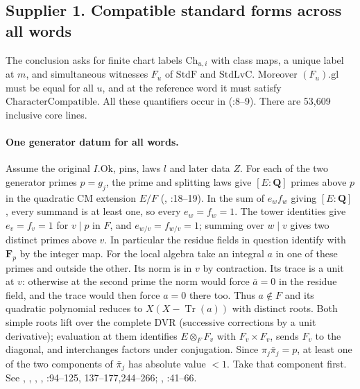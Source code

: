 \subsection{Supplier 1. Compatible standard forms across all words}\label{r12:s1}
The conclusion asks for finite chart labels $\mathrm{Ch}_{u,i}$ with class
maps, a unique label at $m$, and simultaneous witnesses $F_u$ of
$\mathrm{StdF}$ and $\mathrm{StdLvC}$. Moreover $(F_u).\mathrm{gl}$
must be equal for all $u$, and at the reference word it must satisfy
$\mathrm{CharacterCompatible}$. All these quantifiers occur in
(:8--9).
There are 53,609 inclusive core lines.

\paragraph{One generator datum for all words.}
Assume the original $I.\mathrm{Ok}$, pins, laws $l$ and later data $Z$.
For each of the two generator primes $p=g_j$, the prime and splitting
laws give $[E:\mathbf Q]$ primes above $p$ in the quadratic CM extension
$E/F$ (, :18--19).
In the sum of $e_w f_w$ giving $[E:\mathbf Q]$, every summand is at least
one, so every $e_w=f_w=1$. The tower identities give $e_v=f_v=1$ for
$v\mid p$ in $F$, and $e_{w/v}=f_{w/v}=1$; summing over $w\mid v$ gives
two distinct primes above $v$. In particular the residue fields in question
identify with $\mathbf F_p$ by the integer map. For the local algebra
take an integral $a$ in one of these primes and outside the other.
Its norm is in $v$ by contraction. Its trace is a unit at $v$:
otherwise at the second prime the norm would force $\bar a=0$ in
the residue field, and the trace would then force $a=0$ there too.
Thus $a\notin F$ and its quadratic polynomial reduces to
$X(X-\operatorname{Tr}(a))$ with distinct roots. Both simple roots
lift over the complete DVR (successive corrections by a unit derivative);
evaluation at them identifies $E\otimes_F F_v$ with $F_v\times F_v$,
sends $F_v$ to the diagonal, and interchanges factors under conjugation.
Since $\pi_j\bar\pi_j=p$, at least one of the two components of
$\bar\pi_j$ has absolute value $<1$. Take that component first.
See , , ,
, :94--125,
137--177,244--266; ,
:41--66.


